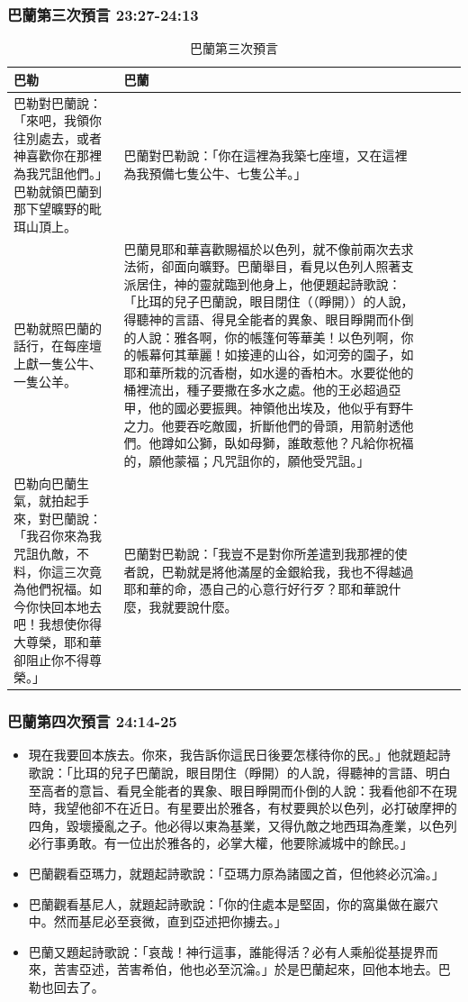 \subsubsection{巴蘭第三次預言 23:27-24:13}
\begin{table}[H]
\begin{tabular}{@{}p{}*{4}{L{\tabcolsep\relax}}@{}}
\toprule
巴勒&巴蘭 \\\hline
巴勒對巴蘭說：「來吧，我領你往別處去，或者神喜歡你在那裡為我咒詛他們。」巴勒就領巴蘭到那下望曠野的毗珥山頂上。&巴蘭對巴勒說：「你在這裡為我築七座壇，又在這裡為我預備七隻公牛、七隻公羊。」\\\hline
巴勒就照巴蘭的話行，在每座壇上獻一隻公牛、一隻公羊。&巴蘭見耶和華喜歡賜福於以色列，就不像前兩次去求法術，卻面向曠野。巴蘭舉目，看見以色列人照著支派居住，神的靈就臨到他身上，他便題起詩歌說：「比珥的兒子巴蘭說，眼目閉住（（睜開））的人說，得聽神的言語、得見全能者的異象、眼目睜開而仆倒的人說：雅各啊，你的帳篷何等華美！以色列啊，你的帳幕何其華麗！如接連的山谷，如河旁的園子，如耶和華所栽的沉香樹，如水邊的香柏木。水要從他的桶裡流出，種子要撒在多水之處。他的王必超過亞甲，他的國必要振興。神領他出埃及，他似乎有野牛之力。他要吞吃敵國，折斷他們的骨頭，用箭射透他們。他蹲如公獅，臥如母獅，誰敢惹他？凡給你祝福的，願他蒙福；凡咒詛你的，願他受咒詛。」\\\hline
巴勒向巴蘭生氣，就拍起手來，對巴蘭說：「我召你來為我咒詛仇敵，不料，你這三次竟為他們祝福。如今你快回本地去吧！我想使你得大尊榮，耶和華卻阻止你不得尊榮。」&巴蘭對巴勒說：「我豈不是對你所差遣到我那裡的使者說，巴勒就是將他滿屋的金銀給我，我也不得越過耶和華的命，憑自己的心意行好行歹？耶和華說什麼，我就要說什麼。\\\hline
\bottomrule
\end{tabular}
\caption{巴蘭第三次預言}
\end{table} 

\subsubsection{巴蘭第四次預言 24:14-25}
\begin{itemize} 
\itemsep-.35em
\item 現在我要回本族去。你來，我告訴你這民日後要怎樣待你的民。」他就題起詩歌說：「比珥的兒子巴蘭說，眼目閉住（睜開）的人說，得聽神的言語、明白至高者的意旨、看見全能者的異象、眼目睜開而仆倒的人說：我看他卻不在現時，我望他卻不在近日。有星要出於雅各，有杖要興於以色列，必打破摩押的四角，毀壞擾亂之子。他必得以東為基業，又得仇敵之地西珥為產業，以色列必行事勇敢。有一位出於雅各的，必掌大權，他要除滅城中的餘民。」
\item 巴蘭觀看亞瑪力，就題起詩歌說：「亞瑪力原為諸國之首，但他終必沉淪。」
\item 巴蘭觀看基尼人，就題起詩歌說：「你的住處本是堅固，你的窩巢做在巖穴中。然而基尼必至衰微，直到亞述把你擄去。」
\item 巴蘭又題起詩歌說：「哀哉！神行這事，誰能得活？必有人乘船從基提界而來，苦害亞述，苦害希伯，他也必至沉淪。」於是巴蘭起來，回他本地去。巴勒也回去了。
\end{itemize} 

